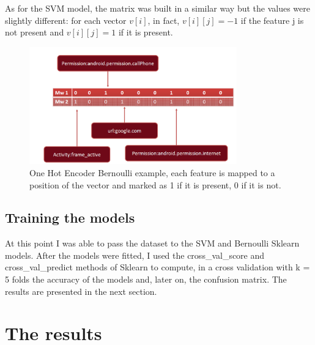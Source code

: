 \documentclass[12pt]{article}
\begin{document}
As for the SVM model, the matrix was built in a similar way but the values were slightly different: for each vector $v[i]$, in fact, $v[i][j] = -1$ if the feature j is not present and $v[i][j] = 1$ if it is present.

\begin{figure}[!ht]
	\centering %
	\includegraphics[width=0.8\textwidth]{hotencode.png} %
	\caption{One Hot Encoder Bernoulli example, each feature is mapped to a position of the vector and marked as 1 if it is present, 0 if it is not.} 
	\label{fig:1_hot_encode}
\end{figure}

\subsection{Training the models}
At this point I was able to pass the dataset to the SVM and Bernoulli Sklearn models. After the models were fitted, I used the cross\_val\_score and cross\_val\_predict methods of Sklearn to compute, in a cross validation with k = 5 folds the accuracy of the models and, later on, the confusion matrix. The results are presented in the next section.

\section{The results}
\label{sec:results}
\end{document}
